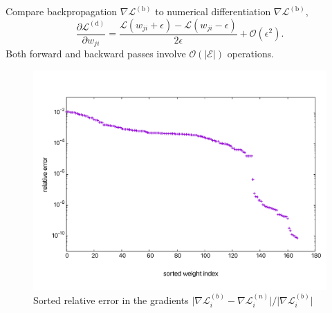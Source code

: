 \documentclass[mathserif,10pt]{beamer}
\begin{document}
\begin{frame}
  Compare backpropagation $\nabla \mathcal{L}^{(\text{b})}$ to numerical differentiation $\nabla \mathcal{L}^{(\text{b})}$,
  \begin{equation}
    \dfrac{\partial \mathcal{L}^{(\text{d})}}{\partial w_{ji}} = \dfrac{\mathcal{L}(w_{ji} + \epsilon) - \mathcal{L}(w_{ji} - \epsilon)}{2\epsilon} + \mathcal{O}(\epsilon^2).
  \end{equation}
  Both forward and backward passes involve $\mathcal{O}(|\mathcal{E}|)$ operations.
\end{frame}

\begin{frame}
  \begin{figure}
    \includegraphics[scale=0.32]{figs/fig03a.pdf}
    \caption{Sorted relative error in the gradients $\bigl| \nabla \mathcal{L}_i^{(b)} - \nabla \mathcal{L}_i^{(n)} \bigr| / \bigl| \nabla \mathcal{L}_i^{(b)}\bigr|$}
  \end{figure}
\end{frame}
\end{document}
